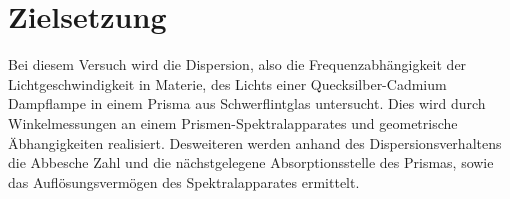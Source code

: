 \section{Zielsetzung}
\label{sec:Zielsetzung}
Bei diesem Versuch wird die Dispersion, also die Frequenzabhängigkeit der Lichtgeschwindigkeit in Materie, des Lichts einer
Quecksilber-Cadmium Dampflampe in einem Prisma aus Schwerflintglas untersucht. Dies wird durch Winkelmessungen
an einem Prismen-Spektralapparates und geometrische Äbhangigkeiten realisiert.
Desweiteren werden anhand des Dispersionsverhaltens die Abbesche Zahl und die nächstgelegene Absorptionsstelle des Prismas, sowie das Auflösungsvermögen des 
Spektralapparates ermittelt.

